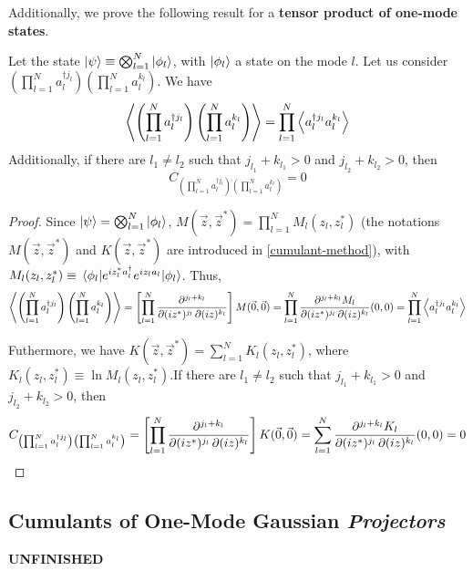 Additionally, we prove the following result for a \textbf{tensor product of one-mode states}.
\begin{theorem}
    Let the state $\ket{\psi} \equiv \bigotimes_{l=1}^N \ket{\phi_l}$, with $\ket{\phi_l}$ a state on the mode $l$. Let us consider $\left(\prod_{l=1}^N a^{\dagger j_l}_l\right) \left(\prod_{l=1}^N a^{k_l}_l\right)$. We have
    \begin{equation}
        \left\langle \left(\prod_{l=1}^N a^{\dagger j_l}_l\right) \left(\prod_{l=1}^N a^{k_l}_l\right) \right\rangle = \prod_{l=1}^N \left\langle a^{\dagger j_l}_l a^{k_l}_l \right\rangle
    \end{equation}
    Additionally, if there are $l_1 \neq l_2$ such that $j_{l_1} + k_{l_1} > 0$ and $j_{l_2} + k_{l_2} > 0$, then
    \begin{equation}
         C_{\left(\prod_{l=1}^N a^{\dagger j_l}_l\right) \left(\prod_{l=1}^N a^{k_l}_l\right)} = 0
    \end{equation}
\end{theorem}
\begin{proof}
    Since $\ket{\psi} = \bigotimes_{l=1}^N \ket{\phi_l}$, $M(\Vec{z}, \Vec{z}^*) = \prod_{l=1}^N M_l(z_l, z_l^*)$ (the notations $M(\Vec{z}, \Vec{z}^*)$ and $K(\Vec{z}, \Vec{z}^*)$ are introduced in \autoref{cumulant-method}), with $M_l(z_l, z_l^*) \equiv \mel{\phi_l}{e^{i z_l^* a^\dagger_l} e^{i z_l a_l}}{\phi_l}$. Thus,
    \begin{equation}
        \left\langle \left(\prod_{l=1}^N a^{\dagger j_l}_l\right) \left(\prod_{l=1}^N a^{k_l}_l\right) \right\rangle = \left[\prod_{l=1}^N \pdv[order = {j_l,k_l}]{}{(i z^*),(i z)}\right]M(\Vec{0}, \Vec{0}) = \prod_{l=1}^N \pdv[order = {j_l,k_l}]{M_l}{(i z^*),(i z)}(0,0) = \prod_{l=1}^N \left\langle a^{\dagger j_l}_l a^{k_l}_l \right\rangle
    \end{equation}

    Futhermore, we have $K(\Vec{z}, \Vec{z}^*) = \sum_{l=1}^N K_l(z_l, z_l^*)$, where $K_l(z_l, z_l^*) \equiv \ln{M_l(z_l, z_l^*)}$.If there are $l_1 \neq l_2$ such that $j_{l_1} + k_{l_1} > 0$ and $j_{l_2} + k_{l_2} > 0$, then
    \begin{equation}
        C_{\left(\prod_{l=1}^N a^{\dagger j_l}_l\right) \left(\prod_{l=1}^N a^{k_l}_l\right)} = \left[\prod_{l=1}^N \pdv[order = {j_l,k_l}]{}{(i z^*),(i z)}\right]K(\Vec{0}, \Vec{0}) = \sum_{l=1}^N \pdv[order = {j_l,k_l}]{K_l}{(i z^*),(i z)}(0,0) = 0
    \end{equation}
\end{proof}

\subsection{Cumulants of One-Mode Gaussian \textit{Projectors}}

\color{red} \textbf{UNFINISHED} \color{black}
